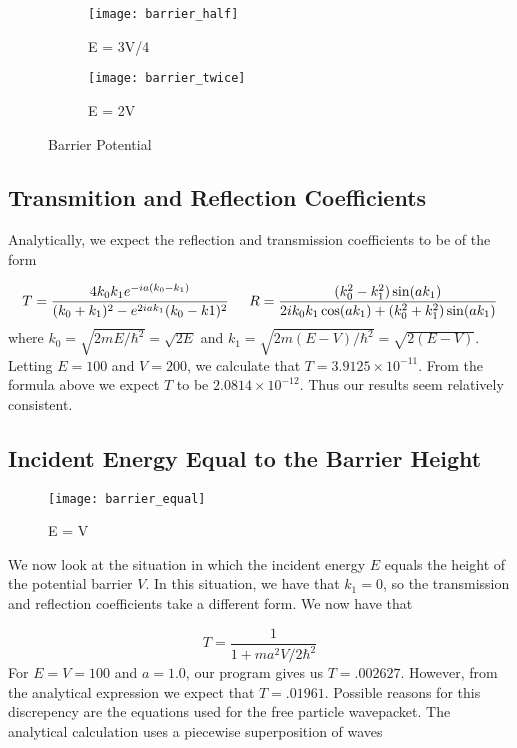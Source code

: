 \documentclass{article}
\begin{document}
\begin{figure}
\centering
\begin{subfigure}[h!]{0.3\textwidth}
\centering
\texttt{[image: barrier\_half]}
\caption{E = 3V/4}
\end{subfigure}
%
\begin{subfigure}[h!]{0.3\textwidth}
\centering
\texttt{[image: barrier\_twice]}
\caption{E = 2V}
\end{subfigure}

\caption{Barrier Potential}
\end{figure}


\subsection{Transmition and Reflection Coefficients}

Analytically, we expect the reflection and transmission coefficients to be of the form

\begin{equation}
T = \frac{4k_0 k_1 e^{-ia(k_0-k_1)}}{(k_0 + k_1)^2 - e^{2iak_1}(k_0-k1)^2} \hspace{0.2in} R = \frac{(k_0^2-k_1^2)\sin(ak_1)}{2ik_0k_1\cos(ak_1)+(k_0^2+k_1^2)\sin(ak_1)}
\end{equation}
%
where $k_0 = \sqrt{2mE/\hbar^2} = \sqrt{2E}$ and $k_1 = \sqrt{2m(E-V)/\hbar^2} = \sqrt{2(E-V)}$. Letting $E = 100$ and $V = 200$, we calculate that $T = 3.9125 \times 10^{-11}$. From the formula above we expect $T$ to be $2.0814 \times 10^{-12}$. Thus our results seem relatively consistent. 

\subsection{Incident Energy Equal to the Barrier Height}

\begin{figure}
\centering
\texttt{[image: barrier\_equal]}
\caption{ E = V }
\end{figure}

We now look at the situation in which the incident energy $E$ equals the height of the potential barrier $V$. In this situation, we have that $k_1 = 0$, so the transmission and reflection coefficients take a different form. We now have that 

\begin{equation}
T = \frac{1}{1+ma^2V/2\hbar^2}
\end{equation}
%
For $ E = V = 100$ and $a=1.0$, our program gives us $T = .002627$. However, from the analytical expression we expect that $T = .01961$. Possible reasons for this discrepency are the equations used for the free particle wavepacket. The analytical calculation uses a piecewise superposition of waves
\end{document}
